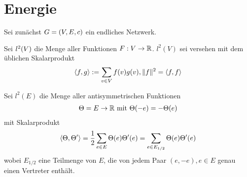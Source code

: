 \section{Energie}
\label{chap:Energie}
Sei zunächst $G = \left(V,E,c\right)$ ein endliches Netzwerk.
\begin{definition}
	Sei $l^2\enb{V}$ die Menge aller Funktionen $F: V \to \mathbb{R}$. $l^2(V)$ sei versehen mit dem üblichen Skalarprodukt 
	\begin{gather}
	\langle f,g\rangle := \sum\limits_{v \in V} f(v)g(v), \lVert f\rVert^2 = \langle f,f\rangle
	\end{gather}	
\end{definition}
\begin{definition}
	Sei $l^2(E)$ die Menge aller antisymmetrischen Funktionen 
	\begin{gather}
	\Theta = E \to \mathbb{R} \text{ mit } \Theta(-e) = -\Theta(e)
	\end{gather}
	mit Skalarprodukt 
	\begin{gather}
	\langle\Theta,\Theta'\rangle = \frac{1}{2}\sum\limits_{e \in E} \Theta(e) \Theta'(e) = \sum\limits_{e \in E_{1/2}} \Theta(e)\Theta'(e)
	\end{gather}
	wobei $E_{1/2}$ eine Teilmenge von $E$, die von jedem Paar $(e,-e), e \in E$ genau einen Vertreter enthält.
\end{definition}

